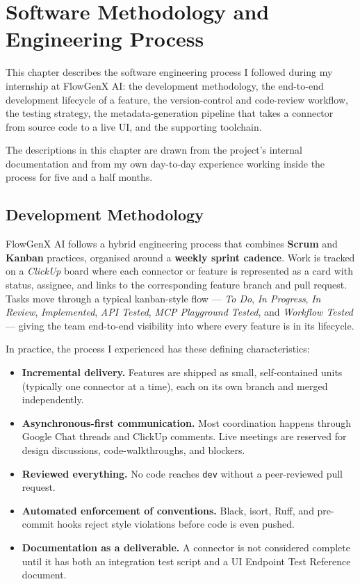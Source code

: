 \chapter{Software Methodology and Engineering Process}
\label{ch:methodology}

This chapter describes the software engineering process I followed
during my internship at FlowGenX AI: the development methodology, the
end-to-end development lifecycle of a feature, the version-control and
code-review workflow, the testing strategy, the metadata-generation
pipeline that takes a connector from source code to a live UI, and
the supporting toolchain.

The descriptions in this chapter are drawn from the project's
internal documentation and from my own day-to-day experience working
inside the process for five and a half months.

\section{Development Methodology}
FlowGenX AI follows a hybrid engineering process that combines
\textbf{Scrum} and \textbf{Kanban} practices, organised around a
\textbf{weekly sprint cadence}. Work is tracked on a \emph{ClickUp}
board where each connector or feature is represented as a card with
status, assignee, and links to the corresponding feature branch and
pull request. Tasks move through a typical kanban-style flow ---
\emph{To Do}, \emph{In Progress}, \emph{In Review},
\emph{Implemented}, \emph{API Tested}, \emph{MCP Playground Tested},
and \emph{Workflow Tested} --- giving the team end-to-end visibility
into where every feature is in its lifecycle.

In practice, the process I experienced has these defining
characteristics:

\begin{itemize}[leftmargin=*]
    \item \textbf{Incremental delivery.} Features are shipped as
    small, self-contained units (typically one connector at a time),
    each on its own branch and merged independently.

    \item \textbf{Asynchronous-first communication.} Most coordination
    happens through Google Chat threads and ClickUp comments. Live
    meetings are reserved for design discussions, code-walkthroughs,
    and blockers.

    \item \textbf{Reviewed everything.} No code reaches \texttt{dev}
    without a peer-reviewed pull request.

    \item \textbf{Automated enforcement of conventions.} Black,
    isort, Ruff, and pre-commit hooks reject style violations before
    code is even pushed.

    \item \textbf{Documentation as a deliverable.} A connector is
    not considered complete until it has both an integration test
    script and a UI Endpoint Test Reference document.
\end{itemize}

